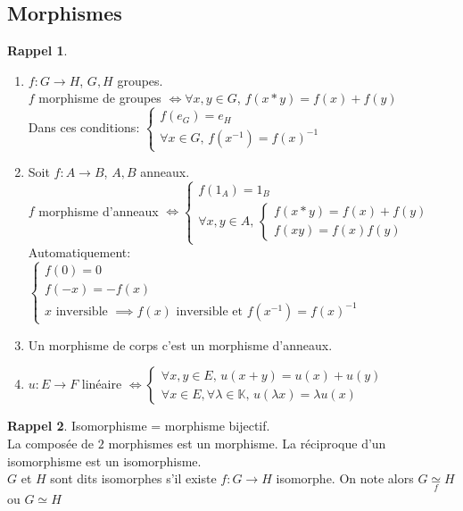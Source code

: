 \documentclass[10pt,a4paper]{article}
\theoremstyle{definition}
\newtheorem*{rappel}{Rappel}
\begin{document}
\subsection{Morphismes}
\begin{rappel} \hfill
\begin{enumerate}
\item $f: G \to H$, $G, H$ groupes. \\
$f$ morphisme de groupes $\iff \forall x, y \in G$, $f(x * y) = f(x) + f(y)$ \\
Dans ces conditions: $\begin{cases}
f(e_G) = e_H \\
\forall x \in G,\, f(x^{-1}) = f(x)^{-1}
\end{cases}$
\item Soit $f: A \to B$, $A, B$ anneaux. \\
$f$ morphisme d'anneaux $\iff \begin{cases}
f(1_A) = 1_B \\
\forall x, y \in A,\, \begin{cases}
f(x * y) = f(x) + f(y) \\
f(xy) = f(x) f(y)
\end{cases}
\end{cases}$ \\
Automatiquement: $\begin{cases}
f(0) = 0 \\
f(-x) = -f(x) \\
x \text{ inversible } \implies f(x) \text{ inversible et } f(x^{-1}) = f(x)^{-1}
\end{cases}$
\item Un morphisme de corps c'est un morphisme d'anneaux.
\item $u: E \to F$ linéaire $\iff \begin{cases}
\forall x, y \in E,\, u(x + y) = u(x) + u(y) \\
\forall x \in E, \forall \lambda \in \mathbb{K},\, u(\lambda x) = \lambda u(x)
\end{cases}$
\end{enumerate}
\end{rappel}
\begin{rappel}
Isomorphisme = morphisme bijectif. \\
La composée de $2$ morphismes est un morphisme. La réciproque d'un isomorphisme est un isomorphisme. \\
$G$ et $H$ sont dits isomorphes s'il existe $f: G \to H$ isomorphe. On note alors $G \underset{f}{\simeq} H$ ou $G \simeq H$
\end{rappel}
\end{document}
